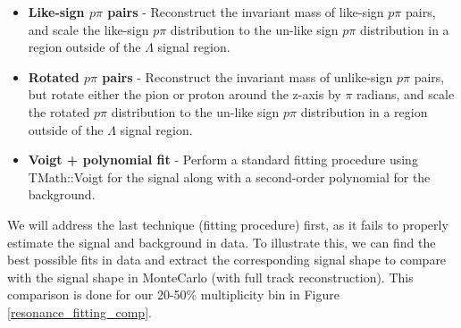 \documentclass[ALICE,manyauthors]{ALICE_analysis_notes}
\begin{document}
 \begin{itemize}
	\item \textbf{Like-sign $p\pi$ pairs} - Reconstruct the invariant mass of like-sign $p\pi$ pairs, and scale the like-sign $p\pi$ distribution to the un-like sign $p\pi$ distribution in a region outside of the $\Lambda$ signal region.
	\item \textbf{Rotated $p\pi$ pairs} - Reconstruct the invariant mass of unlike-sign $p\pi$ pairs, but rotate either the pion or proton around the z-axis by $\pi$ radians, and scale the rotated $p\pi$ distribution to the un-like sign $p\pi$ distribution in a region outside of the $\Lambda$ signal region.
	\item \textbf{Voigt + polynomial fit} - Perform a standard fitting procedure using TMath::Voigt for the signal along with a second-order polynomial for the background.
 \end{itemize}

We will address the last technique (fitting procedure) first, as it fails to properly estimate the signal and background in data. To illustrate this, we can find the best possible fits in data and extract the corresponding signal shape to compare with the signal shape in MonteCarlo (with full track reconstruction). This comparison is done for our 20-50\% multiplicity bin in Figure \ref{resonance_fitting_comp}.
\end{document}

